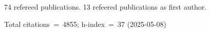 74 refereed publications. 13 refeered publications as first author.

Total citations~=~4855; h-index~=~37 (2025-05-08)